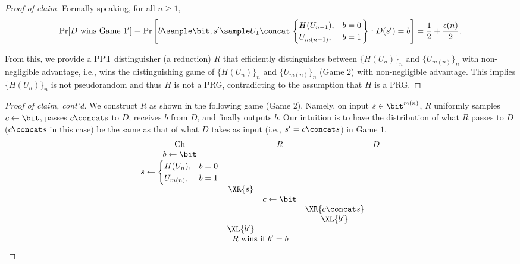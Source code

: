 \begin{answer}[i]
\begin{proof}[Proof of claim]
    Formally speaking, for all $n\ge 1$,
    \begin{equation}\label{eq:p3-1-1}
        \Pr[D\textrm{ wins Game } 1']\equiv 
        \Pr\left[b\sample\bit, s'\sample U_1\concat \left.\begin{cases} 
                H(U_{n-1}), &b = 0 \\
                U_{m(n-1)}, &b = 1 
            \end{cases}\right\} : D(s')=b \right]
        =\frac{1}{2}+\frac{\epsilon(n)}{2}.
    \end{equation}
    
    From this, we provide a PPT distinguisher (a reduction) $R$ that efficiently distinguishes between $\{H(U_n)\}_n$ and $\{U_{m(n)}\}_n$ with non-negligible advantage, i.e., wins the distinguishing game of $\{H(U_n)\}_n$ and $\{U_{m(n)}\}_n$ (Game $2$) with non-negligible advantage. This implies $\{H(U_n)\}_n$ is not pseudorandom and thus $H$ is not a PRG, contradicting to the assumption that $H$ is a PRG.

    \end{proof}\begin{proof}[Proof of claim, cont'd]

    We construct $R$ as shown in the following game (Game 2). Namely, on input $s\in\bit^{m(n)}$, $R$ uniformly samples $c\leftarrow \bit$, passes $c\concat s$ to $D$, receives $b$ from $D$, and finally outputs $b$. Our intuition is to have the distribution of what $R$ passes to $D$ ($c\concat s$ in this case) be the same as that of what $D$ takes as input (i.e., $s'=c\concat s$) in Game $1$.
    {
        \[
            \begin{array}{@{} c c c c c@{}}
            \text{Ch} & & R & & D \\
            b \leftarrow \bit & & & & \\
            s \leftarrow \begin{cases} 
                H(U_n), &b = 0 \\
                U_{m(n)}, &b = 1 
            \end{cases} & & & & \\
            & \XR{s} & & & \\
            & & c\leftarrow \bit & & \\
            & & & \XR{c\concat s} & \\
            & & &\XL{b'} & \\
            & \XL{b'} & & & \\
            \multicolumn{5}{c}{\text{$R$ wins if $b' = b$}}
        \end{array}
        \]
        \label{fig:p3-game2}
    }


\end{proof}
\end{answer}
